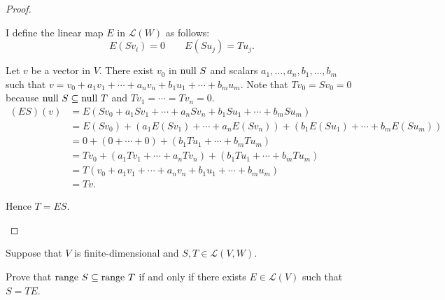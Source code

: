 \begin{proof}
\begin{enumerate}[label={\textbf{Step \arabic*.}},itemindent={1cm}]
              I define the linear map $E$ in $\mathcal{L}(W)$ as follows:
              \[
                  E(Sv_{i}) = 0\qquad E(Su_{j}) = Tu_{j}.
              \]

              Let $v$ be a vector in $V$. There exist $v_{0}$ in $\operatorname{null}\,{S}$ and scalars $a_{1}, \ldots, a_{n}, b_{1}, \ldots, b_{m}$ such that $v = v_{0} + a_{1}v_{1} + \cdots + a_{n}v_{n} + b_{1}u_{1} + \cdots + b_{m}u_{m}$. Note that $Tv_{0} = Sv_{0} = 0$ because $\operatorname{null}\,{S}\subseteq \operatorname{null}\,{T}$ and $Tv_{1} = \cdots = Tv_{n} = 0$.
              \begin{align*}
                  (ES)(v) & = E(Sv_{0} + a_{1}Sv_{1} + \cdots + a_{n}Sv_{n} + b_{1}Su_{1} + \cdots + b_{m}Su_{m})                 \\
                          & = E(Sv_{0}) + (a_{1}E(Sv_{1}) + \cdots + a_{n}E(Sv_{n})) + (b_{1}E(Su_{1}) + \cdots + b_{m}E(Su_{m})) \\
                          & = 0 + (0 + \cdots + 0) + (b_{1}Tu_{1} + \cdots + b_{m}Tu_{m})                                         \\
                          & = Tv_{0} + (a_{1}Tv_{1} + \cdots + a_{n}Tv_{n}) + (b_{1}Tu_{1} + \cdots + b_{m}Tu_{m})                \\
                          & = T(v_{0} + a_{1}v_{1} + \cdots + a_{n}v_{n} + b_{1}u_{1} + \cdots + b_{m}u_{m})                      \\
                          & = Tv.
              \end{align*}

              Hence $T = ES$.\qedhere
    \end{enumerate}
\end{proof}
\newpage

\begin{exercise}
    Suppose that $V$ is finite-dimensional and $S, T \in \mathcal{L}(V, W)$.

    Prove that $\operatorname{range}\,{S} \subseteq \operatorname{range}\,{T}$ if and only if there exists $E \in \mathcal{L}(V)$ such that $S = TE$.
\end{exercise}

